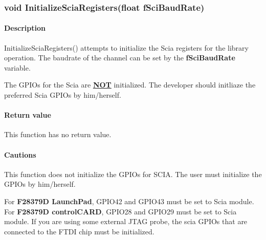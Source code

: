 \documentclass{article}
\begin{document}
\subsubsection{void InitializeSciaRegisters(float fSciBaudRate)}
\label{subsubsection:InitializeSciaRegisters}
\begin{addmargin}[4em]{1em}
	\paragraph{Description}
	InitializeSciaRegisters() attempts to initialize the Scia registers for the library operation. The baudrate of the channel can be set by the \textbf{fSciBaudRate} variable. 
	
	The GPIOs for the Scia are \textbf{\underline{NOT}} initialized. The developer should initliaze the preferred Scia GPIOs by him/herself.



	\paragraph{Return value}
	This function has no return value.
	\paragraph{Cautions}
	\label{subsubsubsubsection:caution-InitializeSciaRegisters}
	This function does not initialize the GPIOs for SCIA. The user must initialize the GPIOs by him/herself.

	For \textbf{F28379D LaunchPad}, GPIO42 and GPIO43 must be set to Scia module. For \textbf{F28379D controlCARD}, GPIO28 and GPIO29 must be set to Scia module. If you are using some external JTAG probe, the scia GPIOs that are connected to the FTDI chip must be initialized.
\end{addmargin}
\end{document}
